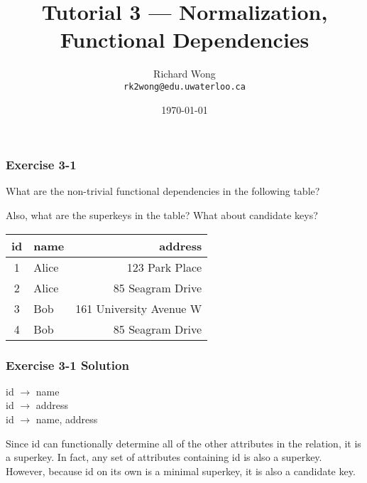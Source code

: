 

\title{Tutorial 3 --- Normalization, Functional Dependencies}

\author{Richard Wong \\ \small \texttt{rk2wong@edu.uwaterloo.ca}}
\date{\today}




\begin{frame}
  \titlepage

\end{frame}


\begin{frame}
\frametitle{Exercise 3-1}

What are the non-trivial functional dependencies in the following table?

Also, what are the superkeys in the table? What about candidate keys?

\begin{center}
  \begin{tabular}{||c l r||}
    \hline
    id & name & address \\ [0.5ex]
    \hline\hline
    1 & Alice & 123 Park Place \\
    \hline
    2 & Alice & 85 Seagram Drive \\
    \hline
    3 & Bob & 161 University Avenue W \\
    \hline
    4 & Bob & 85 Seagram Drive \\
    \hline
  \end{tabular}
\end{center}

\end{frame}


\begin{frame}
\frametitle{Exercise 3-1 Solution}

id $\rightarrow$ name \\
id $\rightarrow$ address \\
id $\rightarrow$ name, address

Since id can functionally determine all of the other attributes in the relation, it is a superkey. In fact, any set of attributes containing id is also a superkey. However, because id on its own is a minimal superkey, it is also a candidate key.

\end{frame}


